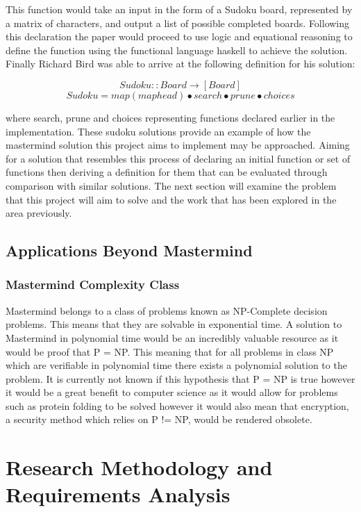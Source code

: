 \documentclass[12pt]{article}  %
\theoremstyle{definition}
\theoremstyle{remark}
\begin{document}
This function would take an input in the form of a Sudoku board, represented by a matrix of characters, and output a list of possible completed boards. Following this declaration the paper would proceed to use logic and equational reasoning to define the function using the functional language haskell to achieve the solution. Finally Richard Bird was able to arrive at the following definition for his solution:

\[ Sudoku :: Board \rightarrow [Board]\]
\[ Sudoku = map (map head) \bullet search \bullet prune \bullet choices\]

where search, prune and choices representing functions declared earlier in the implementation. These sudoku solutions provide an example of how the mastermind solution this project aims to implement may be approached. Aiming for a solution that resembles this process of declaring an initial function or set of functions then deriving a definition for them that can be evaluated through comparison with similar solutions. The next section will examine the problem that this project will aim to solve and the work that has been explored in the area previously.

\subsection {Applications Beyond Mastermind}

\subsubsection {Mastermind Complexity Class}
Mastermind belongs to a class of problems known as NP-Complete decision problems. This means that they are solvable in exponential time. A solution to Mastermind in polynomial time
would be an incredibly valuable resource as it would be proof that P = NP. This meaning that for all problems in class NP which are verifiable in polynomial time there exists a polynomial
solution to the problem. It is currently not known if this hypothesis that P = NP is true however it would be a great benefit to computer science as it would allow for problems such as
protein folding to be solved however it would also mean that encryption, a security method which relies on P != NP, would be rendered obsolete.

\newpage                     %
\section{Research Methodology and Requirements Analysis}\label{ss:back}
\end{document}
